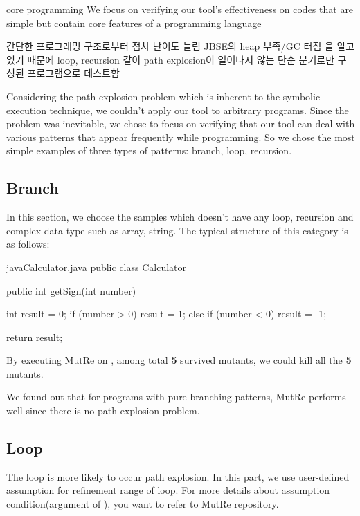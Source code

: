 \documentclass{article}
\begin{document}
core programming 
We focus on verifying our tool's effectiveness on codes that are simple but contain core features of a programming language

간단한 프로그래밍 구조로부터 점차 난이도 늘림
JBSE의 heap 부족/GC 터짐 을 알고있기 때문에 loop, recursion 같이 path explosion이 일어나지 않는 단순 분기로만 구성된 프로그램으로 테스트함


\fi

Considering the path explosion problem which is inherent to the symbolic execution technique, we couldn't apply our tool to arbitrary programs. Since the problem was inevitable, we chose to focus on verifying that our tool can deal with various patterns that appear frequently while programming. So we chose the most simple examples of three types of patterns: branch, loop, recursion.

\subsection{Branch}

In this section, we choose the samples which doesn't have any loop, recursion and complex data type such as array, string. The typical structure of this category is as follows: 

\begin{listingsbox}{java}{Calculator.java}
public class Calculator {
    public int getSign(int number) {
        int result = 0;
        if (number > 0) {
            result = 1;
        } else if (number < 0) {
            result = -1;
        }

        return result;
    }
}
\end{listingsbox}

By executing MutRe on , among total \textbf{5} survived mutants, we could kill all the \textbf{5} mutants.

We found out that for programs with pure branching patterns, MutRe performs well since there is no path explosion problem.

\subsection{Loop}

The loop is more likely to occur path explosion. In this part, we use user-defined assumption for refinement range of loop. For more details about assumption condition(argument of ), you want to refer to MutRe repository. 
\end{document}
